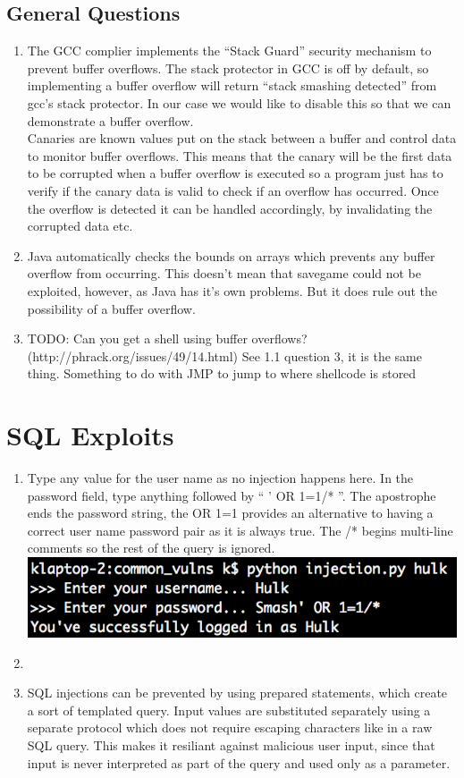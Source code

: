 \documentclass[9pt,a4paper]{article}
\begin{document}
\subsection{General Questions}
\begin{enumerate}
\item The GCC complier implements the ``Stack Guard'' security mechanism to prevent buffer overflows. The stack protector in GCC is off by default, so implementing a buffer overflow will return ``stack smashing detected'' from gcc's stack protector. In our case we would like to disable this so that we can demonstrate a buffer overflow.\\
Canaries are known values put on the stack between a buffer and control data to monitor buffer overflows. This means that the canary will be the first data to be corrupted when a buffer overflow is executed so a program just has to verify if the canary data is valid to check if an overflow has occurred. Once the overflow is detected it can be handled accordingly, by invalidating the corrupted data etc.
\item Java automatically checks the bounds on arrays which prevents any buffer overflow from occurring. This doesn't mean that savegame could not be exploited, however, as Java has it's own problems. But it does rule out the possibility of a buffer overflow.
\item TODO: Can you get a shell using buffer overflows? (http://phrack.org/issues/49/14.html) See 1.1 question 3, it is the same thing. Something to do with JMP to jump to where shellcode is stored
\end{enumerate}


\section{SQL Exploits}
\begin{enumerate}
\item Type any value for the user name as no injection happens here. In the password field, type anything followed by `` ' OR 1=1/* ''. The apostrophe ends the password string, the OR 1=1 provides an alternative to having a correct user name password pair as it is always true. The /* begins multi-line comments so the rest of the query is ignored.\\
\includegraphics{inject}
\item
\item SQL injections can be prevented by using prepared statements, which create a sort of templated query. Input values are substituted separately using a separate protocol which does not require escaping characters like in a raw SQL query. This makes it resiliant against malicious user input, since that input is never interpreted as part of the query and used only as a parameter.
\end{enumerate}
\end{document}
